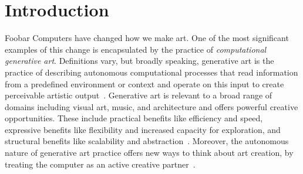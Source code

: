 \documentclass{sigchi}
\begin{document}
\section{Introduction}
Foobar Computers have changed how we make art. One of the most significant examples of this change is encapsulated by the practice of \textit{computational generative art}. Definitions vary, but broadly speaking, generative art is the practice of describing autonomous computational processes that read information from a predefined environment or context and operate on this input to create perceivable artistic output~\cite{shiffman2012nature,reas2010form,doi:10.1080/14626268.2012.709940}. Generative art is relevant to a broad range of domains including visual art, music, and architecture and offers powerful creative opportunities. These include practical benefits like efficiency and speed, expressive benefits like flexibility and increased capacity for exploration, and structural benefits like scalability and abstraction~\cite{mitchell1990}. Moreover, the autonomous nature of generative art practice offers new ways to think about art creation, by treating the computer as an active creative partner~\cite{reas2010form}. 
\end{document}
